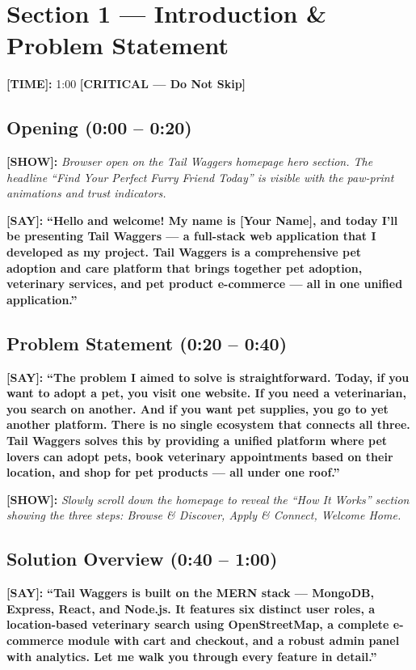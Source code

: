 \documentclass[12pt,a4paper]{article}
\newcommand{\say}[1]{\textbf{\textcolor{narration}{[SAY]:}} \textbf{``#1''}}
\newcommand{\show}[1]{\textbf{\textcolor{screen}{[SHOW]:}} \textit{#1}}
\newcommand{\timing}[1]{\textbf{\textcolor{timing}{[TIME]:}} #1}
\newcommand{\critical}{\textcolor{critical}{\textbf{[CRITICAL --- Do Not Skip]}}}
\begin{document}
\newpage

\section{Section 1 --- Introduction \& Problem Statement}
\label{sec:intro}

\timing{1:00} \hfill \critical

\subsection{Opening (0:00 -- 0:20)}

\show{Browser open on the Tail Waggers homepage hero section. The headline ``Find Your Perfect Furry Friend Today'' is visible with the paw-print animations and trust indicators.}

\say{Hello and welcome! My name is [Your Name], and today I'll be presenting Tail Waggers --- a full-stack web application that I developed as my project. Tail Waggers is a comprehensive pet adoption and care platform that brings together pet adoption, veterinary services, and pet product e-commerce --- all in one unified application.}

\subsection{Problem Statement (0:20 -- 0:40)}

\say{The problem I aimed to solve is straightforward. Today, if you want to adopt a pet, you visit one website. If you need a veterinarian, you search on another. And if you want pet supplies, you go to yet another platform. There is no single ecosystem that connects all three. Tail Waggers solves this by providing a unified platform where pet lovers can adopt pets, book veterinary appointments based on their location, and shop for pet products --- all under one roof.}

\show{Slowly scroll down the homepage to reveal the ``How It Works'' section showing the three steps: Browse \& Discover, Apply \& Connect, Welcome Home.}

\subsection{Solution Overview (0:40 -- 1:00)}

\say{Tail Waggers is built on the MERN stack --- MongoDB, Express, React, and Node.js. It features six distinct user roles, a location-based veterinary search using OpenStreetMap, a complete e-commerce module with cart and checkout, and a robust admin panel with analytics. Let me walk you through every feature in detail.}
\end{document}
